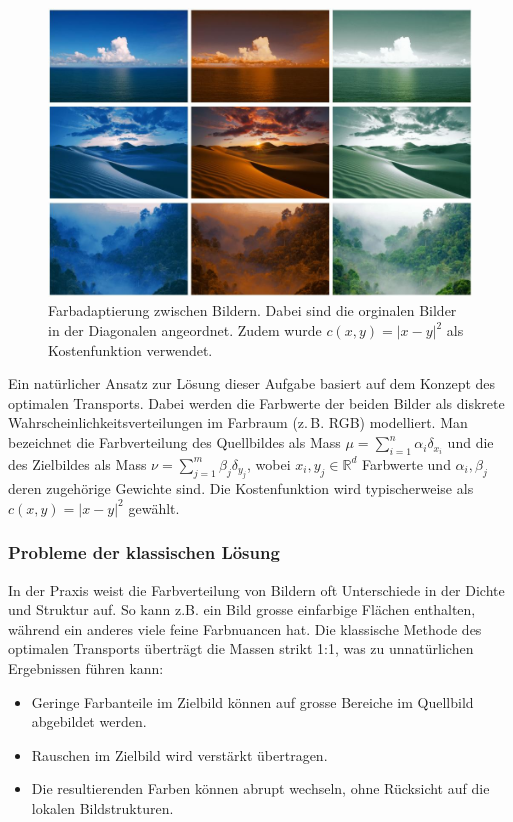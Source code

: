 \begin{figure}
\centering
\includegraphics[width=\textwidth]{papers/mongekant/code/adaption}
\caption{Farbadaptierung zwischen Bildern.
Dabei sind die orginalen Bilder in der Diagonalen angeordnet.
Zudem wurde $c(x,y) = |x - y|^2$ als Kostenfunktion verwendet.
}
\label{mongekant:fig:adaption}
\end{figure}

Ein natürlicher Ansatz zur Lösung dieser Aufgabe
basiert auf dem Konzept des optimalen Transports.
Dabei werden die Farbwerte der beiden Bilder
als diskrete Wahrscheinlichkeitsverteilungen im Farbraum (z.\,B. RGB) modelliert.
Man bezeichnet die Farbverteilung des Quellbildes
als Mass $\mu = \sum_{i=1}^n \alpha_i \delta_{x_i}$ und
die des Zielbildes als Mass $\nu = \sum_{j=1}^m \beta_j \delta_{y_j}$,
wobei $x_i, y_j \in \mathbb{R}^d$ Farbwerte und
$\alpha_i, \beta_j$ deren zugehörige Gewichte sind.
Die Kostenfunktion wird typischerweise als $c(x,y) = |x - y|^2$ gewählt.

\subsubsection{Probleme der klassischen Lösung}
In der Praxis weist die Farbverteilung von Bildern
oft Unterschiede in der Dichte und Struktur auf.
So kann z.B. ein Bild grosse einfarbige Flächen enthalten,
während ein anderes viele feine Farbnuancen hat.
Die klassische Methode des optimalen Transports überträgt die Massen strikt 1:1,
was zu unnatürlichen Ergebnissen führen kann:
\begin{itemize}
\item Geringe Farbanteile im Zielbild können
auf grosse Bereiche im Quellbild abgebildet werden.
\item Rauschen im Zielbild wird verstärkt übertragen.
\item Die resultierenden Farben können abrupt wechseln,
ohne Rücksicht auf die lokalen Bildstrukturen.
\end{itemize}


